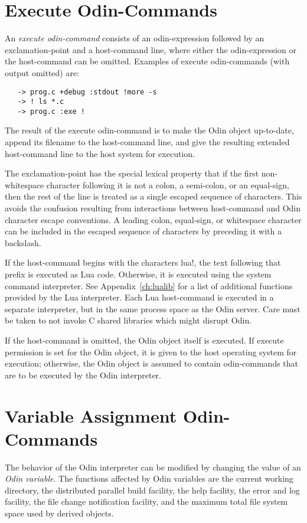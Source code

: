 \section{Execute Odin-Commands}
\label{execute}

An {\em execute odin-command} consists of an odin-expression followed by
an exclamation-point and a host-command line,
where either the odin-expression or the host-command can be omitted.
Examples of execute odin-commands (with output omitted) are:
\begin{verbatim}
   -> prog.c +debug :stdout !more -s
   -> ! ls *.c
   -> prog.c :exe !
\end{verbatim}
The result of the execute odin-command is to make the Odin object up-to-date,
append its filename to the host-command line,
and give the resulting extended host-command line
to the host system for execution.

The exclamation-point has the special lexical property that if the
first non-whitespace character following it
is not a colon, a semi-colon, or an equal-sign,
then the rest of the line is treated as a single escaped sequence of
characters.
This avoids the confusion resulting from interactions between host-command
and Odin character escape conventions.
A leading colon, equal-sign, or whitespace character can be
included in the escaped sequence of characters by preceding it
with a backslash.

If the host-command begins with the characters {\ex lua!}, the text
following that prefix is executed as Lua code.  Otherwise, it is
executed using the system command interpreter.  See
Appendix~\ref{ch:lualib} for a list of additional functions provided
by the Lua interpreter.  Each Lua host-command is executed in a
separate interpreter, but in the same process space as the Odin
server.  Care must be taken to not invoke C shared libraries which
might disrupt Odin.

If the host-command is omitted, the Odin object itself is executed.
If execute permission is set for the Odin object,
it is given to the host operating system for execution;
otherwise, the Odin object is assumed to contain odin-commands that are 
to be executed by the Odin interpreter.


\section{Variable Assignment Odin-Commands}
\label{variable}

The behavior of the Odin interpreter can be modified by changing the value
of an {\em Odin variable}.
The functions affected by Odin variables are
the current working directory,
the distributed parallel build facility,
the help facility, the error and log facility,
the file change notification facility, and
the maximum total file system space used by derived objects.

